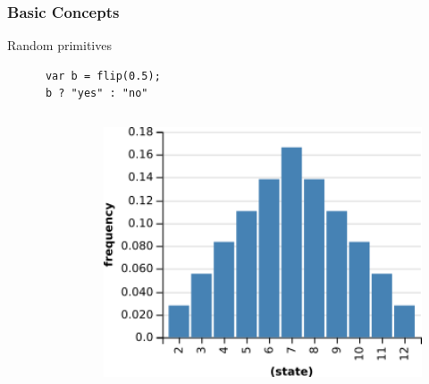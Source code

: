 \documentclass[usenames,dvipsnames]{beamer}
\begin{document}
\begin{frame}[fragile]
  \frametitle{Basic Concepts}
  Random primitives
  \begin{verbatim}
      var b = flip(0.5);
      b ? "yes" : "no"
  \end{verbatim}
  \begin{columns}[t]
    \begin{column}{0.60\textwidth}
      \inputminted[autogobble]{js}{src/enumerate.wppl}
    \end{column}
    \begin{column}{.36\textwidth}
      \begin{figure}[ht]
        \centering
        \includegraphics[width=1\textwidth,keepaspectratio]{figures/enumerate.png}
        \caption*{\label{fig:enumerate}}
      \end{figure}
    \end{column}
  \end{columns}
\end{frame}
\end{document}
